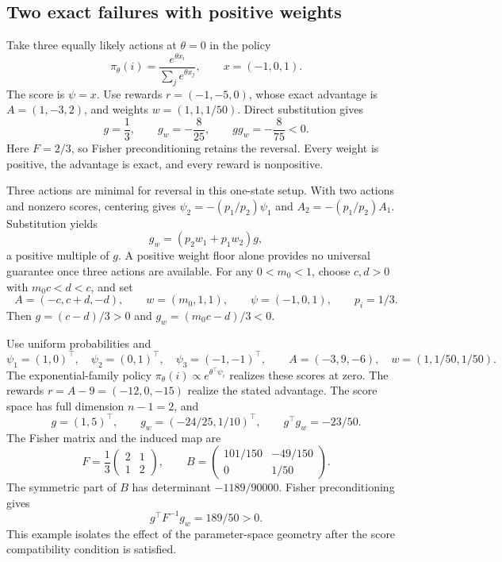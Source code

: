 \subsection{Two exact failures with positive weights}

\begin{example}
\label{ex:scalar-weight}
Take three equally likely actions at $\theta=0$ in the policy
\[
\pi_\theta(i)=\frac{e^{\theta x_i}}{\sum_j e^{\theta x_j}},\qquad x=(-1,0,1).
\]
The score is $\psi=x$. Use rewards $r=(-1,-5,0)$, whose exact advantage is $A=(1,-3,2)$, and weights $w=(1,1,1/50)$. Direct substitution gives
\[
g=\frac13,\qquad g_w=-\frac8{25},\qquad gg_w=-\frac8{75}<0.
\]
Here $F=2/3$, so Fisher preconditioning retains the reversal. Every weight is positive, the advantage is exact, and every reward is nonpositive.
\end{example}

Three actions are minimal for reversal in this one-state setup. With two actions and nonzero scores, centering gives $\psi_2=-(p_1/p_2)\psi_1$ and $A_2=-(p_1/p_2)A_1$. Substitution yields
\[
g_w=(p_2w_1+p_1w_2)g,
\]
a positive multiple of $g$. A positive weight floor alone provides no universal guarantee once three actions are available. For any $0<m_0<1$, choose $c,d>0$ with $m_0c<d<c$, and set
\[
A=(-c,c+d,-d),\qquad w=(m_0,1,1),\qquad \psi=(-1,0,1),\qquad p_i=1/3.
\]
Then $g=(c-d)/3>0$ and $g_w=(m_0c-d)/3<0$.

\begin{example}
\label{ex:full-weight}
Use uniform probabilities and
\[
\psi_1=(1,0)^\top,\quad \psi_2=(0,1)^\top,\quad \psi_3=(-1,-1)^\top,
\qquad A=(-3,9,-6),\quad w=(1,1/50,1/50).
\]
The exponential-family policy $\pi_\theta(i)\propto e^{\theta^\top\psi_i}$ realizes these scores at zero. The rewards $r=A-9=(-12,0,-15)$ realize the stated advantage. The score space has full dimension $n-1=2$, and
\[
g=(1,5)^\top,\qquad g_w=(-24/25,1/10)^\top,\qquad g^\top g_w=-23/50.
\]
The Fisher matrix and the induced map are
\[
F=\frac13\begin{pmatrix}2&1\\1&2\end{pmatrix},\qquad
B=\begin{pmatrix}101/150&-49/150\\0&1/50\end{pmatrix}.
\]
The symmetric part of $B$ has determinant $-1189/90000$. Fisher preconditioning gives
\[
g^\top F^{-1}g_w=189/50>0.
\]
This example isolates the effect of the parameter-space geometry after the score compatibility condition is satisfied.
\end{example}

